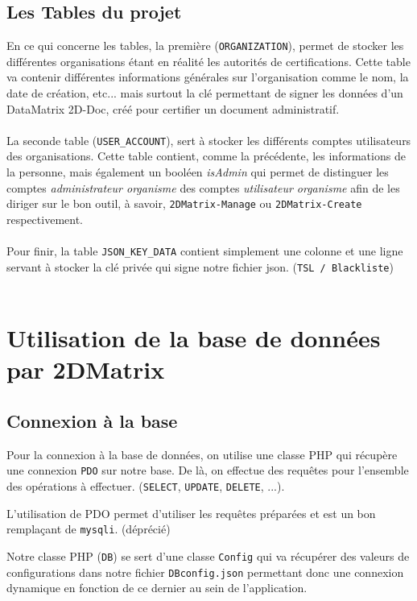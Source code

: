 \subsection{Les Tables du projet}
En ce qui concerne les tables, la première (\texttt{ORGANIZATION}), permet de stocker les différentes organisations étant en réalité les autorités de certifications. Cette table va contenir différentes informations générales sur l'organisation comme le nom, la date de création, etc... mais surtout la clé permettant de signer les données d'un DataMatrix 2D-Doc, créé pour certifier un document administratif.\\\\
La seconde table (\texttt{USER\_ACCOUNT}), sert à stocker les différents comptes utilisateurs des organisations. Cette table contient, comme la précédente, les informations de la personne, mais également un booléen \textit{isAdmin} qui permet de distinguer les comptes \textit{administrateur organisme} des comptes \textit{utilisateur organisme} afin de les diriger sur le bon outil, à savoir, \texttt{2DMatrix-Manage} ou \texttt{2DMatrix-Create} respectivement.\\\\
Pour finir, la table \texttt{JSON\_KEY\_DATA} contient simplement une colonne et une ligne servant à stocker la clé privée qui signe notre fichier json. (\texttt{TSL / Blackliste})\\\\

\section{Utilisation de la base de données par 2DMatrix}

\subsection{Connexion à la base}

Pour la connexion à la base de données, on utilise une classe PHP qui récupère une connexion \texttt{PDO} sur notre base. De là, on effectue des requêtes pour l'ensemble des opérations à effectuer. (\texttt{SELECT}, \texttt{UPDATE}, \texttt{DELETE}, ...). 

L'utilisation de PDO permet d'utiliser les requêtes préparées et est un bon remplaçant de \texttt{mysqli}. (déprécié)

Notre classe PHP (\texttt{DB}) se sert d'une classe \texttt{Config} qui va récupérer des valeurs de configurations dans notre fichier \texttt{DBconfig.json} permettant donc une connexion dynamique en fonction de ce dernier au sein de l'application.

